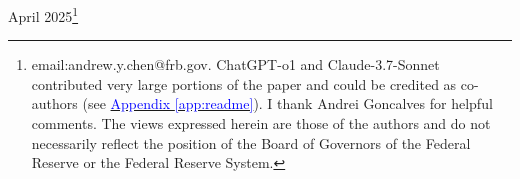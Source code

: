 April 2025\thanks{email:andrew.y.chen@frb.gov. ChatGPT-o1 and Claude-3.7-Sonnet contributed very large portions of the paper and could be credited as co-authors (see \hyperref[app:readme]{\textcolor{blue}{Appendix \ref{app:readme}}}). I thank Andrei Goncalves for helpful comments. The views expressed herein are those of the authors and do not necessarily reflect the position of the Board of Governors of the Federal Reserve or the Federal Reserve System.} 